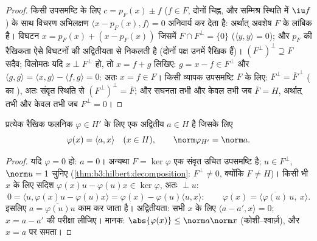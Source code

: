 \begin{proof}
किसी उपसमष्टि के लिए $c =
p_F(x) \pm f$ ($f \in F$, दोनों चिह्न, और सम्मिश्र स्थिति
में $\iu f$) के साथ विचरण अभिलक्षण $\langle x - p_F(x), f\rangle = 0$ अनिवार्य कर देता है: अर्थात्
अवशेष $F$ के लांबिक है। विघटन $x = p_F(x) + (x
- p_F(x))$ जिसमें $F \cap F^\perp = \{0\}$ ($\langle y, y
\rangle = 0$); और $p_F$
की रैखिकता ऐसे विघटनों की अद्वितीयता से निकलती है (दोनों पक्ष उनमें
रैखिक हैं)। $(F^\perp)
^\perp \supseteq F$ सदैव; विलोमतः यदि $x \perp F^\perp$ हो, तो $x = f + g$ लिखिए: $g = x - f \in F^\perp$ और
$\langle g,
g\rangle = \langle x, g\rangle - \langle f, g\rangle = 0$: अतः $x
= f \in F$। किसी व्यापक उपसमष्टि $F$ के लिए: $F^\perp = \bar
F^{\,\perp}$ (
का ), अतः संवृत स्थिति से $(F^\perp)^\perp = \bar F$; और सघनता तभी और केवल तभी
जब $\bar F = H$, अर्थात् तभी और केवल तभी जब $F^\perp = 0$।
\end{proof}

\begin{theorem}[रीस निरूपण]\label{thm:b3:hilbert:riesz}
प्रत्येक  रैखिक फलनिक $\varphi \in H'$ के लिए एक अद्वितीय $a \in H$ है जिसके
लिए
\[
\varphi(x) = \langle a, x\rangle \quad (x \in H),
\qquad \norm\varphi_{H'} = \norm a .
\]
\end{theorem}

\begin{proof}
यदि $\varphi = 0$ हो: $a = 0$। अन्यथा $F = \ker\varphi$ एक संवृत उचित उपसमष्टि है; $u \in F^\perp$,
$\norm u = 1$ चुनिए (\cref{thm:b3:hilbert:decomposition}: $F^\perp \neq 0$, क्योंकि $F \neq H$)। किसी भी $x$ के लिए सदिश
$\varphi(x)u -
\varphi(u)x \in \ker\varphi$, अतः $\perp u$:
\[
0 = \langle u, \varphi(x)u - \varphi(u)x\rangle
= \varphi(x) - \varphi(u)\langle u, x\rangle :
\qquad \varphi(x) = \langle
\overline{\varphi(u)}\,u,\ x\rangle .
\]
इसलिए $a = \overline{\varphi(u)}u$ काम कर जाता है। अद्वितीयता: सभी $x$ के लिए $\langle a
- a', x\rangle = 0$;
$x = a - a'$ की परीक्षा लीजिए। मानक: $\abs{\varphi(x)} \leq \norm a\norm x$ (कोशी--श्वार्ज़), और $x = a$ पर
समता।
\end{proof}

